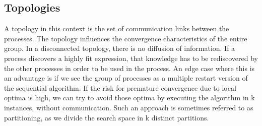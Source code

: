 %
%
\subsection{Topologies}
A topology in this context is the set of communication links between the processes. The topology influences the convergence characteristics of the entire group. In a disconnected topology, there is no diffusion of information. If a process discovers a highly fit expression, that knowledge has to be rediscovered by the other processes in order to be used in the process. An edge case where this is an advantage is if we see the group of processes as a multiple restart version of the sequential algorithm. If the risk for premature convergence due to local optima is high, we can try to avoid those optima by executing the algorithm in k instances, without communication. Such an approach is sometimes referred to as partitioning, as we divide the search space in k distinct partitions.
%
